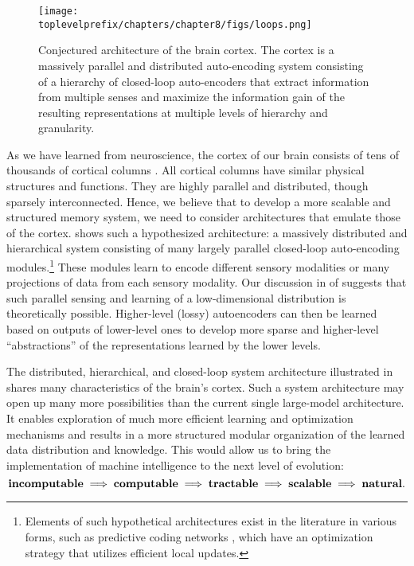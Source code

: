 \documentclass[../../book-main.tex]{subfiles}
\begin{document}
\begin{figure}[t]
\centering
\texttt{[image: \\toplevelprefix/chapters/chapter8/figs/loops.png]}
    \caption{Conjectured architecture of the brain cortex. The cortex is a massively parallel and distributed auto-encoding system consisting of a hierarchy of closed-loop auto-encoders that extract information from multiple senses and maximize the information gain of the resulting representations at multiple levels of hierarchy and granularity.}
    \label{fig:loops}
\end{figure}
As we have learned from neuroscience, the cortex of our brain consists of tens of thousands of cortical columns \cite{Hawkins-2021}. All cortical columns have similar physical structures and functions. They are highly parallel and distributed, though sparsely interconnected. Hence, we believe that to develop a more scalable and structured memory system, we need to consider architectures that emulate those of the cortex.  shows such a hypothesized architecture: a massively distributed and hierarchical system consisting of many largely parallel closed-loop auto-encoding modules.\footnote{Elements of such hypothetical architectures exist in the literature in various forms, such as predictive coding networks \cite{millidge2022predictive}, which have an optimization strategy that utilizes efficient local updates.} These modules learn to encode different sensory modalities or many projections of data from each sensory modality. Our discussion in  of  suggests that such parallel sensing and learning of a low-dimensional distribution is theoretically possible. Higher-level (lossy) autoencoders can then be learned based on outputs of lower-level ones to develop more sparse and higher-level ``abstractions'' of the representations learned by the lower levels.

The distributed, hierarchical, and closed-loop system architecture illustrated in  shares many characteristics of the brain's cortex. Such a system architecture may open up many more possibilities than the current single large-model architecture. It enables exploration of much more efficient learning and optimization mechanisms and results in a more structured modular organization of the learned data distribution and knowledge. This would allow us to bring the implementation of machine intelligence to the next level of evolution:
\begin{equation}
   \text{\textbf{incomputable}} \;
   \Longrightarrow \; \text{\textbf{computable}} \;
   \Longrightarrow \; \text{\textbf{tractable}} \; \Longrightarrow \; 
   \text{\textbf{scalable}} \; \Longrightarrow \; 
   \text{\textbf{natural}}.
\end{equation}
\end{document}

